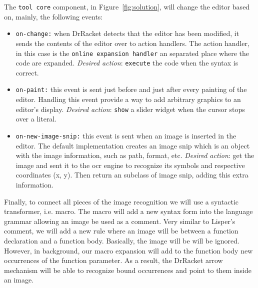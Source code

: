 The \texttt{tool core} component, in Figure~\ref{fig:solution}, will change the editor based on, mainly, the following events:

\begin{itemize}
	\item \texttt{on-change:} when DrRacket detects that the editor has been modified, it sends the contents of the editor over to action handlers.
	The action handler, in this case is the \texttt{online expansion handler} an separated place where the code are expanded. \textit{Desired action}: \texttt{execute} the code when the syntax is correct. 

	\item \texttt{on-paint:} this event is sent just before and just after every painting of the editor. Handling this event provide a way to add arbitrary graphics to an editor's display. \textit{Desired action}: \texttt{show} a slider widget when the cursor stops over a literal.

	\item \texttt{on-new-image-snip:} this event is sent when an image is inserted in the editor. The default implementation creates an image snip which is an object with the image information, such as path, format, etc. \textit{Desired action}: get the image and sent it to the \ac{ocr} engine to recognize its symbols and respective coordinates (x, y). Then return an subclass of image snip, adding this extra information.
\end{itemize}

Finally, to connect all pieces of the image recognition we will use a syntactic transformer, i.e. macro. The macro will add a new syntax form into the language grammar allowing an image be used as a comment. Very similar to Lisper's comment, we will add a new rule where an image will be between a function declaration and a function body. Basically, the image will be will be ignored. However, in background, our macro expansion will add to the function body new occurrences of the function parameter. As a result, the DrRacket arrow mechanism will be able to recognize bound occurrences and point to them inside an image.